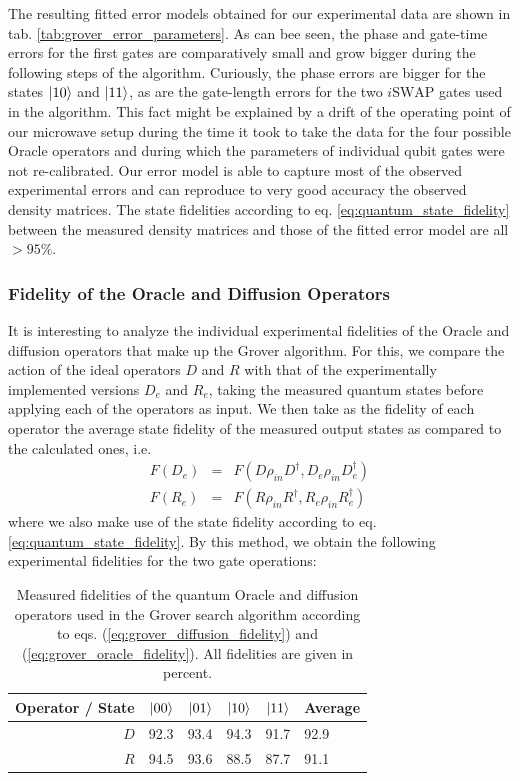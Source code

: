 The resulting fitted error models obtained for our experimental data are shown in tab. \ref{tab:grover_error_parameters}. As can bee seen, the phase and gate-time errors for the first gates are comparatively small and grow bigger during the following steps of the algorithm. Curiously, the phase errors are bigger for the states $\left| 10 \right>$ and $\left| 11 \right>$, as are the gate-length errors for the two $i\mathrm{SWAP}$ gates used in the algorithm. This fact might be explained by a drift of the operating point of our microwave setup during the time it took to take the data for the four possible Oracle operators and during which the parameters of individual qubit gates were not re-calibrated. Our error model is able to capture most of the observed experimental errors and can reproduce to very good accuracy the observed density matrices. The state fidelities according to eq. \ref{eq:quantum_state_fidelity} between the measured density matrices and those of the fitted error model are all $>95\%$.

\subsubsection{Fidelity of the Oracle and Diffusion Operators}

It is interesting to analyze the individual experimental fidelities of the Oracle and diffusion operators that make up the Grover algorithm. For this, we compare the action of the ideal operators $D$ and $R$ with that of the experimentally implemented versions $D_{e}$ and $R_{e}$, taking the measured quantum states before applying each of the operators as input. We then take as the fidelity of each operator the average state fidelity of the measured output states as compared to the calculated ones, i.e.
%
\begin{eqnarray}
F(D_{e}) & = & F(D\rho_{in}D^{\dagger},D_e \rho_{in} D_{e}^{\dagger}) \label{eq:grover_diffusion_fidelity} \\
F(R_{e}) & = & F(R\rho_{in}R^{\dagger},R_e \rho_{in} R_{e}^{\dagger}) \label{eq:grover_oracle_fidelity}
\end{eqnarray}
%
where we also make use of the state fidelity according to eq. \ref{eq:quantum_state_fidelity}. By this method, we obtain the following experimental fidelities for the two gate operations:

\begin{table}[ht!]
\centering
\begin{tabular}{r|rrrr|l}
Operator / State & $\left| 00 \right>$ & $\left| 01 \right>$ & $\left| 10 \right>$ & $\left| 11 \right>$ & Average \\ \hline 
$D$ & 92.3 & 93.4 & 94.3 & 91.7 & 92.9 \\
$R$ & 94.5 & 93.6 & 88.5 & 87.7 & 91.1
\end{tabular}
\caption[Measured fidelities of the quantum Oracle and diffusion operators used in the Grover search algorithm]{Measured fidelities of the quantum Oracle and diffusion operators used in the Grover search algorithm according to eqs. (\ref{eq:grover_diffusion_fidelity}) and (\ref{eq:grover_oracle_fidelity}). All fidelities are given in percent.}
\end{table}

